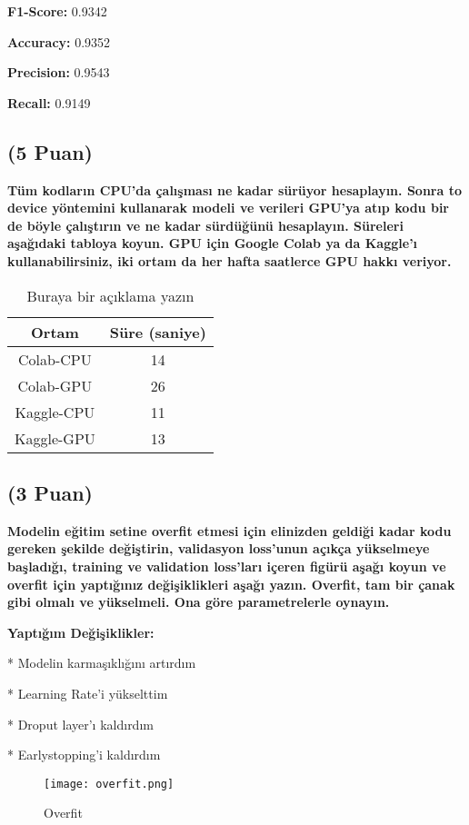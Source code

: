 \documentclass[11pt]{article}
\begin{document}
\textbf{F1-Score:} 0.9342

\textbf{Accuracy:} 0.9352

\textbf{Precision:} 0.9543

\textbf{Recall:} 0.9149

\newpage
\subsection{(5 Puan)} \textbf{Tüm kodların CPU'da çalışması ne kadar sürüyor hesaplayın. Sonra to device yöntemini kullanarak modeli ve verileri GPU'ya atıp kodu bir de böyle çalıştırın ve ne kadar sürdüğünü hesaplayın. Süreleri aşağıdaki tabloya koyun. GPU için Google Colab ya da Kaggle'ı kullanabilirsiniz, iki ortam da her hafta saatlerce GPU hakkı veriyor.}

\begin{table}[ht!]
    \centering
    \caption{Buraya bir açıklama yazın}
    \begin{tabular}{c|c}
        Ortam & Süre (saniye) \\\hline
        Colab-CPU & 14 \\
        Colab-GPU & 26\\
        Kaggle-CPU & 11\\
        Kaggle-GPU & 13\\
    \end{tabular}
    \label{tab:my_table}
\end{table}

\subsection{(3 Puan)} \textbf{Modelin eğitim setine overfit etmesi için elinizden geldiği kadar kodu gereken şekilde değiştirin, validasyon loss'unun açıkça yükselmeye başladığı, training ve validation loss'ları içeren figürü aşağı koyun ve overfit için yaptığınız değişiklikleri aşağı yazın. Overfit, tam bir çanak gibi olmalı ve yükselmeli. Ona göre parametrelerle oynayın.}

\textbf{Yaptığım Değişiklikler:}

    * Modelin karmaşıklığını artırdım
    
    * Learning Rate'i yükselttim
    
    * Droput layer'ı kaldırdım
    
    * Earlystopping'i kaldırdım
    

\begin{figure}[h]
  \centering
  \shorthandoff{=}
  \texttt{[image: overfit.png]}
  \shorthandoff{=}
  \caption[Şekil 5]{Overfit}
\end{figure}
\end{document}
